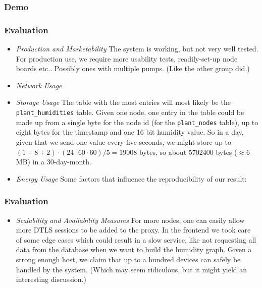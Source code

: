 \documentclass[10pt, xcolor=svgnames]{beamer}
\begin{document}
\begin{frame}
    \frametitle{Demo}

    

\end{frame}

\begin{frame}
    \frametitle{Evaluation}

    \begin{itemize}
        \item \emph{Production and Marketability} The system is working, but not very well tested. For production use, we require more usability tests, readily-set-up node boards etc.. Possibly ones with multiple pumps. (Like the other group did.)
        \item \emph{Network Usage}
        \item \emph{Storage Usage} The table with the most entries will most likely be the \texttt{plant\_humidities} table. Given one node, one entry in the table could be made up from a single byte for the node id (for the \texttt{plant\_nodes} table), up to eight bytes for the timestamp and one 16 bit humidity value. So in a day, given that we send one value every five seconds, we might store up to \((1+8+2) \cdot (24 \cdot 60 \cdot 60) / 5 = 19008\) bytes, so about \(5702400\) bytes (\(\approx 6\)MB) in a 30-day-month.
        \item \emph{Energy Usage} Some factors that influence the reproducibility of our result:
    \end{itemize}
\end{frame}

\begin{frame}
    \frametitle{Evaluation}
    \begin{itemize}
        \item \emph{Scalability and Availability Measures} For more nodes, one can easily allow more DTLS sessions to be added to the proxy. In the frontend we took care of some edge cases which could result in a slow service, like not requesting all data from the database when we want to build the humidity graph. Given a strong enough host, we claim that up to a hundred devices can safely be handled by the system. (Which may seem ridiculous, but it might yield an interesting discussion.)
    \end{itemize}

\end{frame}
\end{document}
